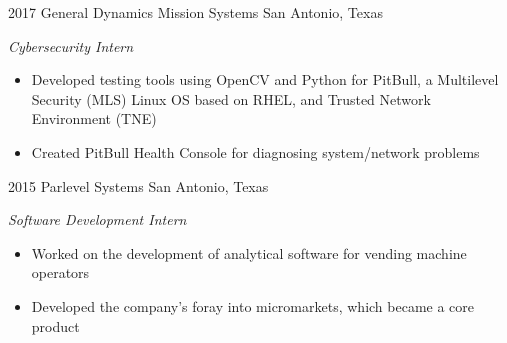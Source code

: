 \documentclass[print]{friggeri-cv} %
\begin{document}
\begin{entrylist}

	\entry
	{2017}
	{General Dynamics Mission Systems}
	{San Antonio, Texas}
	{\emph{Cybersecurity Intern}
		\begin{itemize}
			\item Developed testing tools using OpenCV and Python for PitBull, a Multilevel Security (MLS) Linux OS based on RHEL, and Trusted Network Environment (TNE) 
			\item Created PitBull Health Console for diagnosing system/network problems
		\end{itemize}
	}
\vspace{-5pt}


	\entry
	{2015}
	{Parlevel Systems}
	{San Antonio, Texas}
	{\emph{Software Development Intern}
		\begin{itemize}
			\item Worked on the development of analytical software for vending machine operators
			\item Developed the company's foray into micromarkets, which became a core product
		\end{itemize}
	}
\vspace{-25pt}

\end{entrylist}

%

\end{document}
